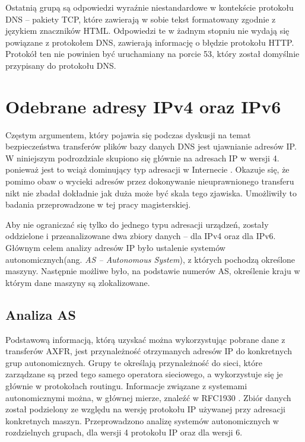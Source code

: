 Ostatnią grupą są odpowiedzi wyraźnie niestandardowe w kontekście protokołu DNS -- pakiety TCP, które zawierają w sobie tekst formatowany
zgodnie z językiem znaczników HTML. Odpowiedzi te w żadnym stopniu nie wydają się powiązane z protokołem DNS, zawierają informację
o błędzie protokołu HTTP. Protokół ten nie powinien być uruchamiany na porcie 53, który został domyślnie przypisany do protokołu DNS.

\section{Odebrane adresy IPv4 oraz IPv6}
\label{sec:adresy_ip}
\noindent Częstym argumentem, który pojawia się podczas dyskusji na temat bezpieczeństwa transferów plików bazy danych DNS jest ujawnianie
adresów IP. W niniejszym podrozdziale skupiono się głównie na adresach IP w wersji 4. ponieważ jest to wciąż dominujący typ adresacji
w Internecie \cite{Ipv6_deployment}. Okazuje się, że pomimo obaw o wycieki adresów przez dokonywanie nieuprawnionego transferu nikt nie
zbadał dokładnie jak duża może być skala tego zjawiska. Umożliwiły to badania przeprowadzone w tej pracy magisterskiej.

Aby nie ograniczać się tylko do jednego typu adresacji urządzeń, zostały oddzielone i przeanalizowane dwa zbiory danych -- dla IPv4
oraz dla IPv6. Głównym celem analizy adresów IP było ustalenie systemów autonomicznych(ang. \textit{AS -- Autonomous System}),
z których pochodzą określone maszyny. Następnie możliwe było, na podstawie numerów AS, określenie kraju w którym dane maszyny są
zlokalizowane.

\subsection{Analiza AS}
\noindent Podstawową informacją, którą uzyskać można wykorzystując pobrane dane z transferów AXFR, jest przynależność otrzymanych adresów IP
do konkretnych grup autonomicznych. Grupy te określają przynależność do sieci, które zarządzane są przed tego samego operatora
sieciowego, a wykorzystuje się je głównie w protokołach routingu. Informacje związane z systemami autonomicznymi można, w głównej
mierze, znaleźć w RFC1930 \cite{RFC1930}. Zbiór danych został podzielony ze względu na wersję protokołu IP używanej przy adresacji
konkretnych maszyn. Przeprowadzono analizę systemów autonomicznych w rozdzielnych grupach, dla wersji 4 protokołu IP oraz dla wersji 6.

